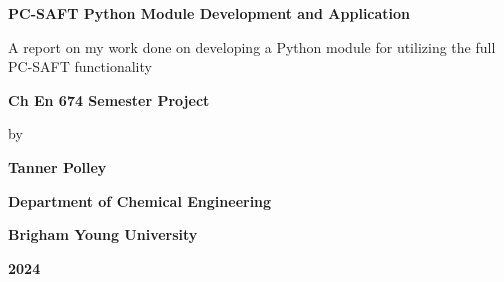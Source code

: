 \documentclass[12pt, letterpaper]{article}
\begin{document}
\begin{titlepage}
    \centering
    
    {\Huge \bfseries{PC-SAFT Python Module Development and Application}\par}
    \vspace{1cm}
    {\large A report on my work done on developing a Python module for utilizing the full PC-SAFT functionality\par}

    \vspace{2cm}
    {\Large\bfseries Ch En 674 Semester Project\par}  %
    \vspace{2cm}
    {\large by\par}
    \vspace{2cm}
    {\Large\bfseries Tanner Polley\par}
    \vspace{0.5cm}
    {\Large\bfseries Department of Chemical Engineering\par}
    {\Large\bfseries Brigham Young University\par}
    {\Large\bfseries 2024\par}
\end{titlepage}

\tableofcontents
\newpage

\end{document}
